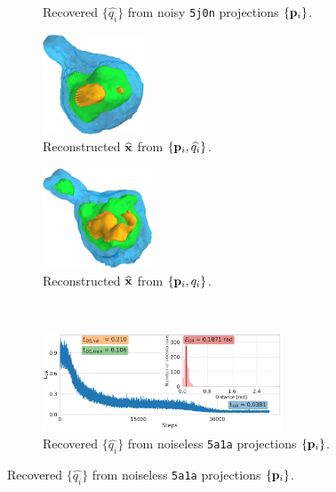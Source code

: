 \begin{figure}[t]
\begin{subfigure}[b]{0.44\linewidth}
        \caption{Recovered $\{ \widehat{q_i} \}$ from noisy \texttt{5j0n} projections $\{ \mathbf{p}_i \}$.
        }%
        \label{fig:5j0n-noise16-orientation-recovery}
    \end{subfigure}
    \hfill
    \begin{subfigure}[b]{0.26\linewidth}
        \centering
        \includegraphics[height=8em]{figures/5j0n_reconstruction_noise16}
        \caption{Reconstructed $\widehat{\mathbf{x}}$ from $\{ \mathbf{p}_i, \widehat{q_i} \}$.}%
        \label{fig:5j0n-noise16-reconstruction-recovered}
    \end{subfigure}
    \hfill
    \begin{subfigure}[b]{0.26\linewidth}
        \centering
        \includegraphics[height=8em]{figures/5j0n_reconstruction_GT_noise16}
        \caption{Reconstructed $\widehat{\mathbf{x}}$ from $\{ \mathbf{p}_i, q_i \}$.}%
        \label{fig:5j0n-noise16-reconstruction-true}
    \end{subfigure}
    \\ \vspace{1em}
    \begin{subfigure}[b]{0.44\linewidth}
        \centering
        \includegraphics[height=8em]{figures/5a1a_noise0_ar_aa}
        \caption{Recovered $\{ \widehat{q_i} \}$ from noiseless \texttt{5a1a} projections $\{ \mathbf{p}_i \}$.
        }%
        \label{fig:5a1a-noise0-orientation-recovery}
    \end{subfigure}

\end{figure}
